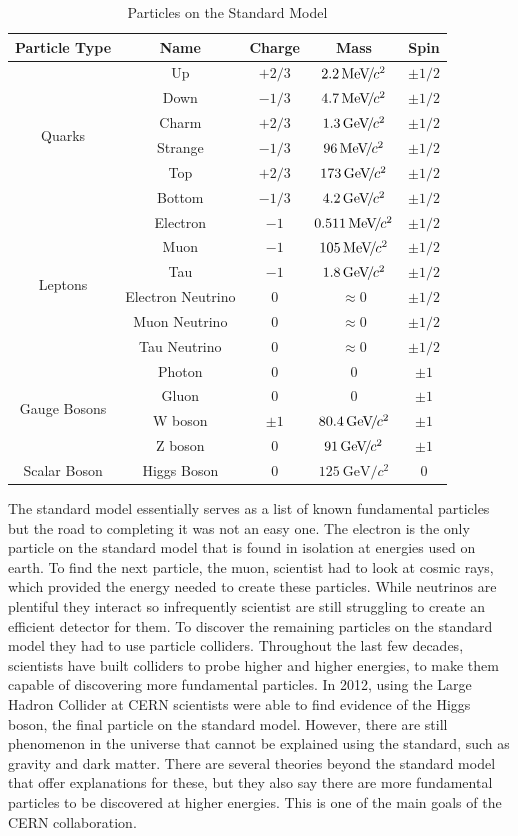 \begin{table}
\caption{Particles on the Standard Model}
\label{tab:particles}
\begin{center}
\begin{tabular}{|c|c|c|c|c|}
\hline
Particle Type & Name & Charge & Mass & Spin \\
\hline
\multirow{6}{*}{Quarks} & Up & $+2/3$ & $2.2{\,\text{Me\hspace{-.08em}V\hspace{-0.16em}/\hspace{-0.08em}}c^\text{2}}$ & $\pm 1/2$ \\
& Down & $-1/3$ & $4.7{\,\text{Me\hspace{-.08em}V\hspace{-0.16em}/\hspace{-0.08em}}c^\text{2}}$ & $\pm 1/2$ \\
& Charm & $+2/3$ & $1.3{\,\text{Ge\hspace{-.08em}V\hspace{-0.16em}/\hspace{-0.08em}}c^\text{2}}$ & $\pm 1/2$ \\
& Strange & $-1/3$ & $96{\,\text{Me\hspace{-.08em}V\hspace{-0.16em}/\hspace{-0.08em}}c^\text{2}}$ & $\pm 1/2$ \\
& Top & $+2/3$ & $173{\,\text{Ge\hspace{-.08em}V\hspace{-0.16em}/\hspace{-0.08em}}c^\text{2}}$ & $\pm 1/2$ \\
& Bottom & $-1/3$ & $4.2{\,\text{Ge\hspace{-.08em}V\hspace{-0.16em}/\hspace{-0.08em}}c^\text{2}}$ & $\pm 1/2$ \\
\hline
\multirow{6}{*}{Leptons} & Electron & $-1$ & $0.511{\,\text{Me\hspace{-.08em}V\hspace{-0.16em}/\hspace{-0.08em}}c^\text{2}}$ & $\pm 1/2$ \\
& Muon & $-1$ & $105{\,\text{Me\hspace{-.08em}V\hspace{-0.16em}/\hspace{-0.08em}}c^\text{2}}$ & $\pm 1/2$ \\
& Tau & $-1$ & $1.8{\,\text{Ge\hspace{-.08em}V\hspace{-0.16em}/\hspace{-0.08em}}c^\text{2}}$ & $\pm 1/2$ \\
& Electron Neutrino & $0$ & $\approx 0$ & $\pm 1/2$ \\
& Muon Neutrino & $0$ & $\approx 0$ & $\pm 1/2$ \\
& Tau Neutrino & $0$ & $\approx 0$ & $\pm 1/2$ \\
\hline
\multirow{4}{*}{Gauge Bosons} & Photon & 0 & 0 & $\pm 1$ \\
& Gluon & 0 & 0 & $\pm 1$ \\
& W boson & $\pm 1$ & $80.4{\,\text{Ge\hspace{-.08em}V\hspace{-0.16em}/\hspace{-0.08em}}c^\text{2}}$ & $\pm 1$ \\
& Z boson & 0 & $91{\,\text{Ge\hspace{-.08em}V\hspace{-0.16em}/\hspace{-0.08em}}c^\text{2}}$ & $\pm 1$ \\
\hline
Scalar Boson & Higgs Boson & 0 & $125~\mathrm{GeV}/c^2$ & 0 \\
\hline
\end{tabular}
\end{center}
\end{table} 
The standard model essentially serves as a list of known fundamental particles but the road to completing it was not an easy one. The electron is the only particle on the standard model that is found in isolation at energies used on earth. To find the next particle, the muon, scientist had to look at cosmic rays, which provided the energy needed to create these particles. While neutrinos are plentiful they interact so infrequently scientist are still struggling to create an efficient detector for them. To discover the remaining particles on the standard model they had to use particle colliders. Throughout the last few decades, scientists have built colliders to probe higher and higher energies, to make them capable of discovering more fundamental particles. In 2012, using the Large Hadron Collider at CERN scientists were able to find evidence of the Higgs boson, the final particle on the standard model. However, there are still phenomenon in the universe that cannot be explained using the standard, such as gravity and dark matter. There are several theories beyond the standard model that offer explanations for these, but they also say there are more fundamental particles to be discovered at higher energies. This is one of the main goals of the CERN collaboration. 

